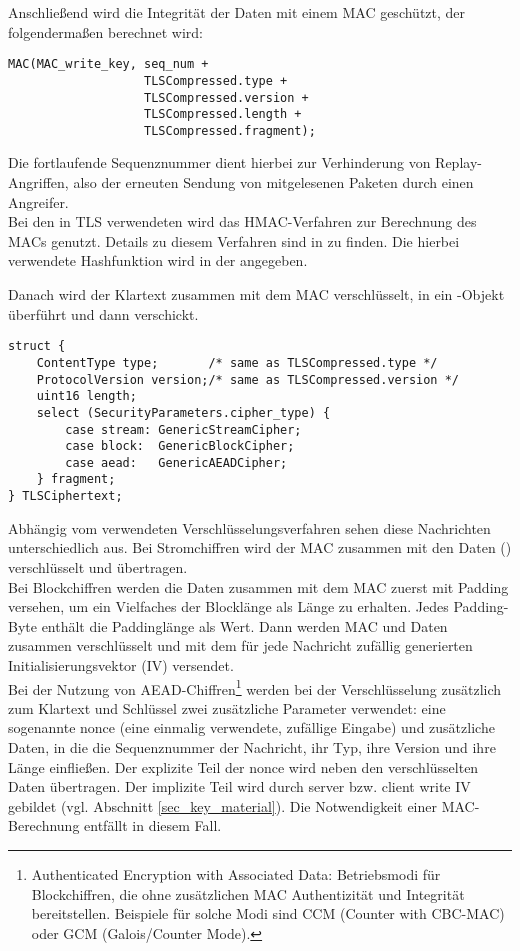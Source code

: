 Anschließend wird die Integrität der Daten mit einem MAC geschützt, der folgendermaßen berechnet wird:
\begin{lstlisting}
MAC(MAC_write_key, seq_num +
				   TLSCompressed.type +
				   TLSCompressed.version +
				   TLSCompressed.length +
				   TLSCompressed.fragment);
\end{lstlisting}
Die fortlaufende Sequenznummer  dient hierbei zur Verhinderung von Replay-Angriffen, also der erneuten Sendung von mitgelesenen Paketen durch einen Angreifer.\\
Bei den in TLS verwendeten \ciphersuites{} wird das HMAC-Verfahren zur Berechnung des MACs genutzt. Details zu diesem Verfahren sind in \cite{hmac97} zu finden. Die hierbei verwendete Hashfunktion wird in der \ciphersuite{} angegeben. 

Danach wird der Klartext zusammen mit dem MAC verschlüsselt, in ein -Objekt überführt und dann verschickt.

\begin{lstlisting}
struct {
	ContentType type;       /* same as TLSCompressed.type */
	ProtocolVersion version;/* same as TLSCompressed.version */
	uint16 length;
	select (SecurityParameters.cipher_type) {
	    case stream: GenericStreamCipher;
	    case block:  GenericBlockCipher;
	    case aead:   GenericAEADCipher;
	} fragment;
} TLSCiphertext;
\end{lstlisting}

Abhängig vom verwendeten Verschlüsselungsverfahren sehen diese Nachrichten unterschiedlich aus. Bei Stromchiffren wird der MAC zusammen mit den Daten () verschlüsselt und übertragen. \\
Bei Blockchiffren werden die Daten zusammen mit dem MAC zuerst mit Padding versehen, um ein Vielfaches der Blocklänge als Länge zu erhalten. Jedes Padding-Byte enthält die Paddinglänge als Wert. Dann werden MAC und Daten zusammen verschlüsselt und mit dem für jede Nachricht zufällig generierten Initialisierungsvektor (IV) versendet.\\
Bei der Nutzung von AEAD-Chiffren\footnote{Authenticated Encryption with Associated Data: Betriebsmodi für Blockchiffren, die ohne zusätzlichen MAC Authentizität und Integrität bereitstellen. Beispiele für solche Modi sind CCM (Counter with CBC-MAC) oder GCM (Galois/Counter Mode).} werden bei der Verschlüsselung zusätzlich zum Klartext und Schlüssel zwei zusätzliche Parameter verwendet: eine sogenannte nonce (eine einmalig verwendete, zufällige Eingabe) und zusätzliche Daten, in die die Sequenznummer der Nachricht, ihr Typ, ihre Version und ihre Länge einfließen. Der explizite Teil der nonce wird neben den verschlüsselten Daten übertragen. Der implizite Teil wird durch server bzw. client write IV gebildet (vgl. Abschnitt \ref{sec_key_material}). Die Notwendigkeit einer MAC-Berechnung entfällt in diesem Fall.


